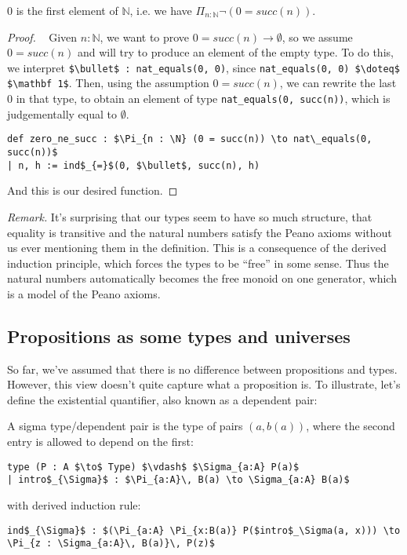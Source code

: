 \documentclass[a4paper, 12pt]{article}
\newcommand{\N}{\mathbb{N}}
\theoremstyle{changedot}
\theoremstyle{changedotbreak}
\theoremstyle{nonumberplain}
\newtheorem{proof}{Proof}
\begin{document}
\begin{theorem}\label{thm:zero_ne_succ}
  $0$ is the first element of $\N$, i.e. we have $\Pi_{n:\N} \neg(0 = succ(n))$.
\end{theorem}
\begin{proof}~
  Given $n : \N$, we want to prove $0 = succ(n) \to \emptyset$, so we assume $0 = succ(n)$ and will try to produce an element of the empty type. To do this, we interpret \lstinline{$\bullet$ : nat_equals(0, 0)}, since \lstinline{nat_equals(0, 0) $\doteq$ $\mathbf 1$}. Then, using the assumption $0 = succ(n)$, we can rewrite the last $0$ in that type, to obtain an element of type \lstinline{nat_equals(0, succ(n))}, which is judgementally equal to $\emptyset$.

\begin{lstlisting}[mathescape=true]
def zero_ne_succ : $\Pi_{n : \N} (0 = succ(n)) \to nat\_equals(0, succ(n))$
| n, h := ind$_{=}$(0, $\bullet$, succ(n), h)
\end{lstlisting}
  And this is our desired function.
\end{proof}

\textit{Remark.} It's surprising that our types seem to have so much structure, that equality is transitive and the natural numbers satisfy the Peano axioms without us ever mentioning them in the definition. This is a consequence of the derived induction principle, which forces the types to be ``free'' in some sense. Thus the natural numbers automatically becomes the free monoid on one generator, which is a model of the Peano axioms.

\subsection{Propositions as some types and universes}
So far, we've assumed that there is no difference between propositions and types. However, this view doesn't quite capture what a proposition is. To illustrate, let's define the existential quantifier, also known as a dependent pair:

\begin{definition}
  A sigma type/dependent pair is the type of pairs $(a, b(a))$, where the second entry is allowed to depend on the first:

\begin{lstlisting}
type (P : A $\to$ Type) $\vdash$ $\Sigma_{a:A} P(a)$
| intro$_{\Sigma}$ : $\Pi_{a:A}\, B(a) \to \Sigma_{a:A} B(a)$
\end{lstlisting}

  with derived induction rule:

\begin{lstlisting}
ind$_{\Sigma}$ : $(\Pi_{a:A} \Pi_{x:B(a)} P($intro$_\Sigma(a, x))) \to \Pi_{z : \Sigma_{a:A}\, B(a)}\, P(z)$
\end{lstlisting}
\end{definition}
\end{document}
